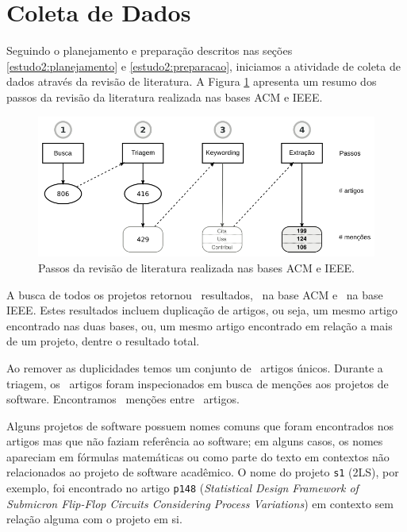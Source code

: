
\section{Coleta de Dados} \label{estudo2:coleta} %

Seguindo o planejamento e preparação descritos nas seções
\ref{estudo2:planejamento} e \ref{estudo2:preparacao}, iniciamos a atividade de coleta de
dados através da revisão de literatura.
A Figura \ref{estudo2-revisao-literatura} apresenta um resumo dos passos da revisão da literatura
realizada nas bases ACM e IEEE.

\begin{figure}[h]
  \center
  \includegraphics[scale=0.35]{imagens/estudo2-revisao-literatura.png}
  \caption{Passos da revisão de literatura realizada nas bases ACM e IEEE.}
  \label{estudo2-revisao-literatura}
\end{figure}

A busca de todos os projetos retornou \SearchCount \ resultados,
\SearchACMCount \ na base ACM e \SearchIEEECount \ na base IEEE.
Estes resultados incluem duplicação de artigos, ou seja,
um mesmo artigo encontrado nas duas bases, ou, um mesmo artigo
encontrado em relação a mais de um projeto, dentre o resultado total.

Ao remover as duplicidades temos um conjunto de \SearchUniqueCount \ artigos
únicos. Durante a triagem, 
os \SearchUniqueCount \ artigos foram inspecionados em busca de menções aos
projetos de software. Encontramos \ScreeningCount \ menções entre
\ScreeningUniqueCount \ artigos.

Alguns projetos de software possuem nomes comuns que foram encontrados nos
artigos mas que não faziam referência ao software; em alguns casos, os nomes
apareciam em fórmulas matemáticas ou como parte do texto em contextos não
relacionados ao projeto de software acadêmico. O nome do projeto \texttt{s1}
(2LS), por exemplo, foi encontrado no artigo \texttt{p148} ({\it Statistical Design
Framework of Submicron Flip-Flop Circuits Considering Process Variations}) em
contexto sem relação alguma com o projeto em si.

